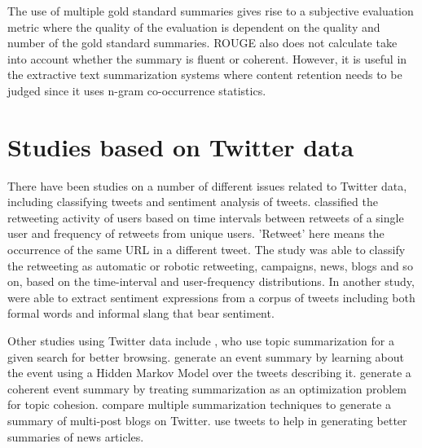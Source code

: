 The use of multiple gold standard summaries gives rise to a subjective evaluation metric where the quality of the evaluation is dependent on the quality and number of the gold standard summaries. ROUGE also does not calculate take into account whether the summary is fluent or coherent. However, it is useful in the extractive text summarization systems where content retention needs to be judged since it uses n-gram co-occurrence statistics.


\section{Studies based on Twitter data}

There have been studies on a number of different issues related to Twitter data, including classifying tweets and sentiment analysis of tweets. \cite{ghosh2011entropy} classified the retweeting activity of users based on time intervals between retweets of a single user and frequency of retweets from unique users. 'Retweet' here means the occurrence of the same URL in a different tweet. The study was able to classify the retweeting as automatic or robotic retweeting, campaigns, news, blogs and so on, based on the time-interval and user-frequency distributions. In another study, \cite{chen2012extracting} were able to extract sentiment expressions from a corpus of tweets including both formal words and informal slang that bear sentiment.

Other studies using Twitter data include \cite{o2010tweetmotif}, who use topic summarization for a given search for better browsing. \cite{chakrabarti2011event} generate an event summary by learning about the event using a Hidden Markov Model over the tweets describing it. \cite{wang2014socially} generate a coherent event summary by treating summarization as an optimization problem for topic cohesion. \cite{inouye2011comparing} compare multiple summarization techniques to generate a summary of multi-post blogs on Twitter. \cite{wei2014utilizing} use tweets to help in generating better summaries of news articles.

